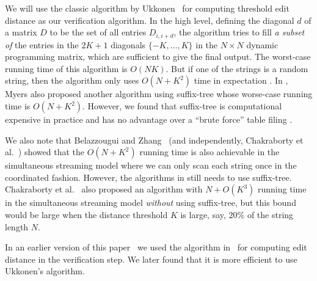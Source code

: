 We will use the classic algorithm by Ukkonen~\cite{Ukkonen85} for computing threshold edit distance as our verification algorithm.  In the high level, defining the diagonal $d$ of a matrix $D$ to be the set of all entries $D_{i, i+d}$,
the algorithm tries to fill {\em a subset of} the entries in the $2K+1$ diagonals $\{-K, \ldots, K\}$ in the $N \times N$ dynamic programming matrix, which are sufficient to give the final output.  The worst-case running time of this algorithm is $O(N K)$. But if one of the strings is a random string, then the algorithm only uses $O(N + K^2)$ time in expectation \cite{Myers86}.   In \cite{Myers86}, Myers also proposed another algorithm using suffix-tree whose worse-case running time is $O(N+K^2)$. However, we found that suffix-tree is computational expensive in practice and has no advantage over a ``brute force'' table filing \cite{Ukkonen85}. 

We also note that Belazzougui and Zhang~\cite{BZ16} (and independently, Chakraborty et al.~\cite{CGK16b}) showed that the $O(N + K^2)$ running time is also achievable in the simultaneous streaming model where we can only scan each string once in the coordinated fashion.  However, the algorithms in \cite{BZ16,CGK16b} still needs to use suffix-tree.  Chakraborty et al.~\cite{CGK16b} also proposed an algorithm with $N + O(K^3)$ running time in the simultaneous streaming model {\em without} using suffix-tree, but this bound would be large when the distance threshold $K$ is large, say, $20\%$ of the string length $N$.

In an earlier version of this paper~\cite{ZZ17} we used the algorithm in~\cite{LDW11} for computing edit distance in the verification step.  We later found that it is more efficient to use Ukkonen's algorithm.



